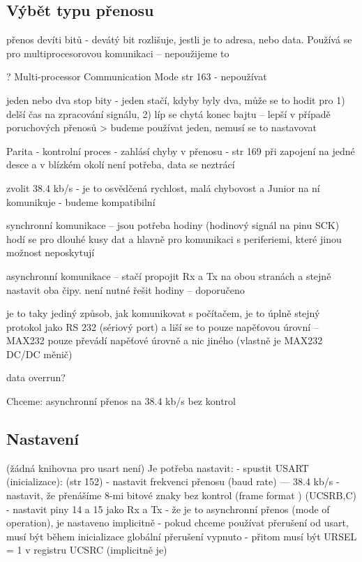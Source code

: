 \subsection{Výbět typu přenosu }


přenos devíti bitů - devátý bit rozlišuje, jestli je to adresa, nebo data. 
Používá se pro multiprocesorovou komunikaci -- nepoužijeme to  

? Multi-processor Communication Mode str 163 - nepoužívat 

jeden nebo dva stop bity - jeden stačí, kdyby byly dva, může se to hodit pro 
1) delší čas na zpracování signálu, 
2) líp se chytá konec bajtu -- lepší v případě poruchových přenosů 
> budeme používat jeden, nemusí se to nastavovat 


 Parita - kontrolní proces - zahlásí chyby v přenosu - str 169 při zapojení na jedné desce a v blízkém okolí není potřeba, data se neztrácí 
 
 zvolit 38.4 kb/s - je to osvědčená rychlost, malá chybovost a Junior na ní komunikuje - budeme kompatibilní 
 
 synchronní komunikace -- jsou potřeba hodiny (hodinový signál na pinu SCK) 
 hodí se pro dlouhé kusy dat a hlavně pro komunikaci s periferiemi, které jinou možnost neposkytují 
 
 asynchronní komunikace -- stačí propojit Rx a Tx na obou stranách a stejně nastavit oba čipy. není nutné řešit hodiny --  doporučeno   
 
 je to taky jediný způsob, jak komunikovat s počítačem, je to úplně stejný protokol jako RS 232 (sériový port) a liší se to pouze napěťovou úrovní -- MAX232 pouze převádí napěťové úrovně a nic jiného (vlastně je MAX232 DC/DC měnič)
 
 data overrun? 
 
Chceme: asynchronní přenos na 38.4 kb/s bez kontrol  


\subsection{Nastavení}

(žádná knihovna pro usart není)
Je potřeba nastavit: 
- spustit USART (inicializace):  (str 152)
   - nastavit frekvenci přenosu (baud rate)  --- 38.4 kb/s 
   - nastavit, že přenášíme 8-mi bitové znaky bez kontrol  (frame format ) (UCSRB,C)
   - nastavit piny 14 a 15 jako Rx a Tx 
   - že je to  asynchronní přenos (mode of operation), je nastaveno implicitně 
   - pokud chceme používat přerušení od usart, musí být během inicializace 
     globální přerušení vypnuto 
   - přitom musí být URSEL = 1 v registru UCSRC (implicitně je)
   
